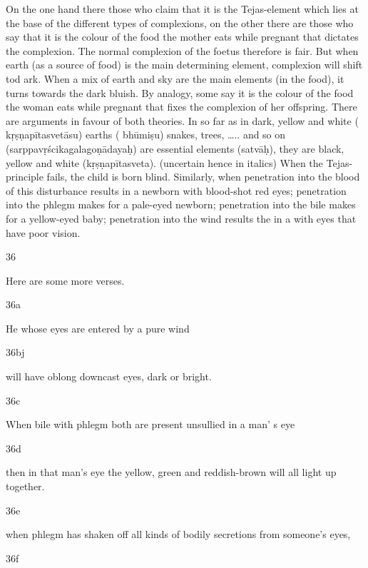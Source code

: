 \begin{translation}
\begin{tt}
On the one hand there those who claim that it is the Tejas-element 
  which lies at the base of the different types of complexions, on the other there 
  are those who say that it is the colour of the food the mother eats while 
  pregnant that dictates the complexion. The normal complexion of the foetus 
  therefore is fair. But when earth (as a source of food) is the main determining 
  element, complexion will shift tod ark. When a mix of earth and sky are the 
  main elements (in the food), it turns towards the dark bluish. By analogy, some 
  say it is the colour of the food the woman eats while pregnant that fixes the 
  complexion of her offspring. There are arguments in favour of both theories. 
  In so far as in dark, yellow and white ( kṛṣṇapītasvetāsu)  earths ( bhūmiṣu) 
  snakes, trees, ….. and so on (sarppavṛścikagalagoṇādayaḥ) are essential 
  elements (satvāḥ), they are black, yellow and white (kṛṣṇapītasveta). (uncertain 
  hence in italics)
  When the Tejas-principle fails, the child is born blind. Similarly, when 
  penetration into the blood of this disturbance results in a newborn with 
  blood-shot red eyes; penetration into the phlegm makes for a pale-eyed 
  newborn; penetration into the bile makes for a yellow-eyed baby; penetration 
  into the wind results  the in a with eyes that have poor vision. 
  
\item[36]

Here are some more verses.
  
\item[36a]

He whose eyes are entered by a pure wind
  
\item[36bj]

will have oblong downcast eyes, dark or bright.
  
\item[36c]

When bile with phlegm both are present unsullied in a man’ s eye 
  
\item[36d]

then in that man’s eye the yellow, green and reddish-brown will all light 
  up together. 
  
\item[36e]

when phlegm has shaken off all kinds of bodily secretions from 
  someone’s eyes,
  
\item[36f]


\end{tt}
\end{translation}
